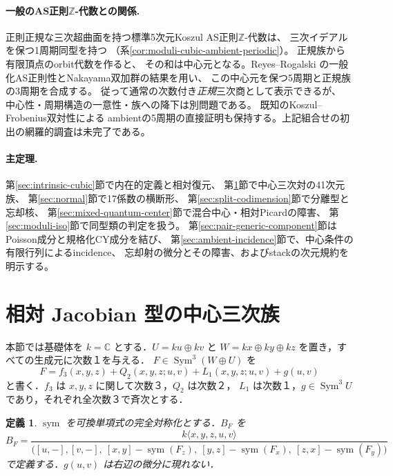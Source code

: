 \documentclass[11pt,a4paper]{ltjsarticle}
\numberwithin{equation}{section}
\newtheorem{definition}[theorem]{定義}
\newcommand{\C}{\mathbb C}
\newcommand{\Sym}{\operatorname{Sym}}
\newcommand{\Symm}{\operatorname{sym}}
\begin{document}
\paragraph{一般のAS正則$\mathbb Z$-代数との関係.}
正則正規な三次超曲面を持つ標準5次元Koszul AS正則$\mathbb Z$-代数は、
三次イデアルを保つ1周期同型を持つ
（系\ref{cor:moduli-cubic-ambient-periodic}）。
正規族\cite{PChanNymanNormalFamily}から有限頂点のorbit代数を作ると、
その和は中心元となる。Reyes--Rogalski\cite[Theorem~5.15, Lemmas~5.9 and~4.5]{RRGeneralizedAS}
の一般化AS正則性とNakayama双加群の結果を用い、
この中心元を保つ5周期と正規族の3周期を合成する。
従って通常の次数付き\emph{正規}三次商として表示できるが、
中心性・周期構造の一意性・族への降下は別問題である。
既知のKoszul--Frobenius双対性\cite{PBondalPolishchukHelices}による
ambientの5周期の直接証明も保持する。上記組合せの初出の網羅的調査は未完了である。

\paragraph{主定理.}
第\ref{sec:intrinsic-cubic}節で内在的定義と相対復元、
第\ref{sec:construction}節で中心三次対の41次元族、
第\ref{sec:normal}節で17係数の横断形、
第\ref{sec:split-codimension}節で分離型と忘却核、
第\ref{sec:mixed-quantum-center}節で混合中心・相対Picardの障害、
第\ref{sec:moduli-iso}節で同型類の判定を扱う。
第\ref{sec:pair-generic-component}節はPoisson成分と規格化CY成分を結び、
第\ref{sec:ambient-incidence}節で、中心条件の有限行列によるincidence、
忘却射の微分とその障害、およびstackの次元規約を明示する。





\section{相対 Jacobian 型の中心三次族}\label{sec:construction}
本節では基礎体を $k=\C$ とする．$U=ku\oplus kv$ と
$W=kx\oplus ky\oplus kz$ を置き，すべての生成元に次数１を与える．
$F\in\Sym^3(W\oplus U)$ を
\begin{equation}\label{eq:Ffull}
 F=f_3(x,y,z)+Q_2(x,y,z;u,v)+L_1(x,y,z;u,v)+g(u,v)
\end{equation}
と書く．$f_3$ は $x,y,z$ に関して次数３，$Q_2$ は次数２，
$L_1$ は次数１，$g\in\Sym^3U$ であり，それぞれ全次数３で斉次とする．

\begin{definition}\label{def:B}
$\Symm$ を可換単項式の完全対称化とする．$B_F$ を
\begin{equation}\label{eq:B}
 B_F=\frac{k\langle x,y,z,u,v\rangle}{
 \bigl([u,-],[v,-],\ [x,y]-\Symm(F_z),\
 [y,z]-\Symm(F_x),\ [z,x]-\Symm(F_y)\bigr)}
\end{equation}
で定義する．$g(u,v)$ は右辺の微分に現れない．
\end{definition}
\end{document}
